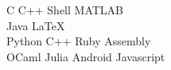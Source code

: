 \documentclass[letterpaper]{deedy-resume} %
\begin{document}
\begin{minipage}[t]{0.33\textwidth}
C \textbullet{} C++ \textbullet{} Shell \textbullet{} MATLAB \\ 
Java \textbullet{} \LaTeX \\
Python \textbullet{} C++ \textbullet{} Ruby \textbullet{} Assembly \\
OCaml \textbullet{} Julia \textbullet{} Android \textbullet{} Javascript

\sectionspace %


\end{minipage} %
\hfill
%
%
\end{document}
